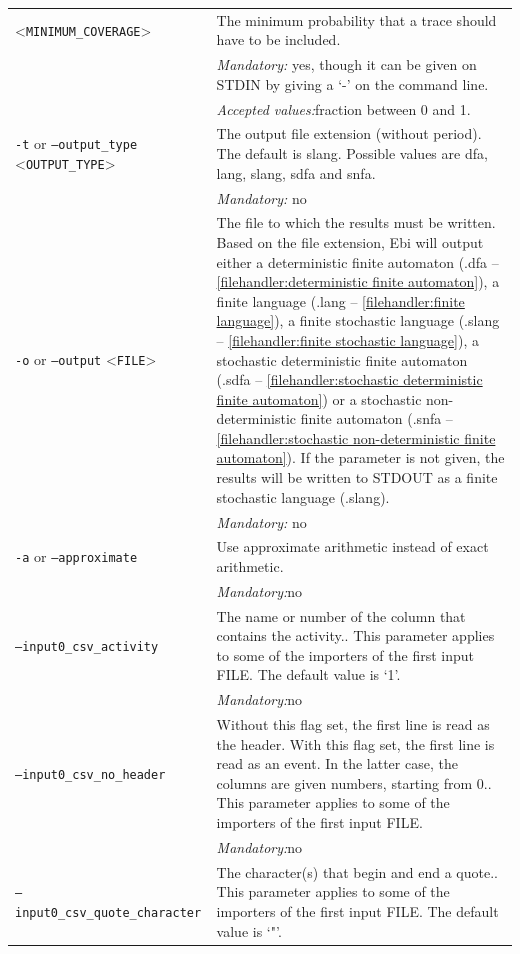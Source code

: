 {\begin{tabularx}{\linewidth}{lX}
<\texttt{MINIMUM\_COVERAGE}>&The minimum probability that a trace should have to be included.\\
&\textit{Mandatory:} \quad yes, though it can be given on STDIN by giving a `-' on the command line.\\
&\textit{Accepted values:}\quad fraction between 0 and 1.\\
\texttt{-t} or \texttt{--output\_type} <\texttt{OUTPUT\_TYPE}> &
The output file extension (without period). The default is slang. Possible values are dfa, lang, slang, sdfa and snfa.\\
&\textit{Mandatory:} \quad no\\
\texttt{-o} or \texttt{--output} <\texttt{FILE}> &
The file to which the results must be written. Based on the file extension, Ebi will output either a deterministic finite automaton (.dfa -- \cref{filehandler:deterministic finite automaton}), a finite language (.lang -- \cref{filehandler:finite language}), a finite stochastic language (.slang -- \cref{filehandler:finite stochastic language}), a stochastic deterministic finite automaton (.sdfa -- \cref{filehandler:stochastic deterministic finite automaton}) or a stochastic non-deterministic finite automaton (.snfa -- \cref{filehandler:stochastic non-deterministic finite automaton}).
If the parameter is not given, the results will be written to STDOUT as a finite stochastic language (.slang).\\
&\textit{Mandatory:} \quad no\\
\texttt{-a} or \texttt{--approximate} & Use approximate arithmetic instead of exact arithmetic.\\
&\textit{Mandatory:}\quad no\\
\texttt{--input0\_csv\_activity} & The name or number of the column that contains the activity.. This parameter applies to some of the importers of the first input FILE. The default value is `1'.\\
&\textit{Mandatory:}\quad no\\
\texttt{--input0\_csv\_no\_header} & Without this flag set, the first line is read as the header. 
    With this flag set, the first line is read as an event. In the latter case, the columns are given numbers, starting from 0.. This parameter applies to some of the importers of the first input FILE. \\
&\textit{Mandatory:}\quad no\\
\texttt{--input0\_csv\_quote\_character} & The character(s) that begin and end a quote.. This parameter applies to some of the importers of the first input FILE. The default value is `"'.\\

\end{tabularx}}
